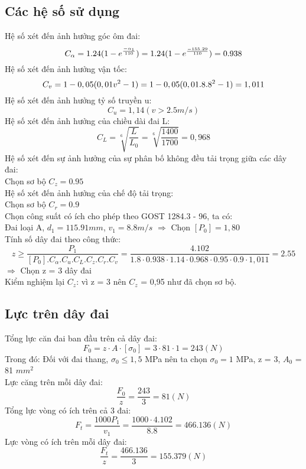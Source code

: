 \subsection{Các hệ số sử dụng}
Hệ số xét đến ảnh hưởng góc ôm đai: \\
\[
    C_{\alpha} = 1.24(1 - e^{\frac{-\alpha_1}{110}}) = 1.24(1 - e^{\frac{-155.29}{110}}) = 0.938 \\
\]
Hệ số xét đến ảnh hưởng vận tốc: \\
\[
    C_v = 1 - 0,05(0,01v^2 - 1) = 1 - 0,05(0,01.8.8^2 - 1) = 1,011 \\
\]
Hệ số xét đến ảnh hưởng tỷ số truyền u: \\
\[
    C_u = 1,14 (v > 2.5 m/s)
\]
Hệ số xét đến ảnh hưởng của chiều dài đai L: \\
\[
    C_L = \sqrt[6]{\frac{L}{L_0}} = \sqrt[6]{\frac{1400}{1700}} = 0,968
\]
Hệ số xét đến sự ảnh hưởng của sự phân bố không đều tải trọng giữa các dây đai: \\
Chọn sơ bộ $C_z = 0.95$ \\
Hệ số xét đến ảnh hưởng của chế độ tải trọng: \\ 
Chọn sơ bộ $C_r = 0.9$ \\   
Chọn công suất có ích cho phép theo GOST 1284.3 - 96, ta có: \\
Đai loại A, $d_1 = 115.91 mm$, $v_1 = 8.8 m/s$ 
$\Rightarrow$ Chọn $[P_0] = 1,80$ \\
Tính số dây đai theo công thức: \\
\[
    z \geq \frac{P_1}{[P_0].C_{\alpha}.C_u.C_L.C_z.C_r.C_v} = \frac{4.102}{1.8\cdot 0.938\cdot 1.14\cdot 0.968\cdot 0.95\cdot 0.9\cdot 1,011} = 2.55
\]
$\Rightarrow$ Chọn z = 3 dây đai\\
Kiểm nghiệm lại $C_z$: vì z = 3 nên $C_z$ = 0,95 như đã chọn sơ bộ.
\subsection{Lực trên dây đai}
Tổng lực căn đai ban đầu trên cả  dây đai: \\
\[
    F_0 = z\cdot A\cdot [\sigma_0] = 3\cdot 81\cdot 1 = 243 (N)
\]
Trong đó: Đối với đai thang, $\sigma_0 \leq 1,5$ MPa nên ta chọn $\sigma_0 = 1$ MPa, z = 3, $A_0$ = 81 $mm^2$ \\
Lực căng trên mỗi dây đai: \\
\[
    \frac{F_0}{z} = \frac{243}{3} = 81 (N)
\]
Tổng lực vòng có ích trên cả 3 đai: \\
\[
    F_t =\frac{1000P_1}{v_1} = \frac{1000\cdot 4.102}{8.8} = 466.136 (N)
\]
Lực vòng có ích trên mỗi dây đai: \\
\[
    \frac{F_t}{z} = \frac{466.136}{3} = 155.379 (N)
\]

